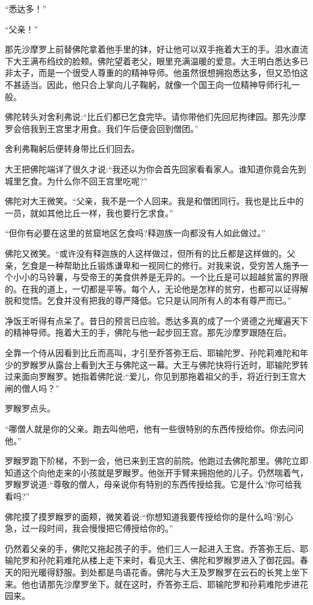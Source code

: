 \documentclass[12pt,twoside,openany]{book}
\begin{document}
“悉达多！”

“父亲！”

那先沙摩罗上前替佛陀拿着他手里的钵，好让他可以双手拖着大王的手。泪水直流下大王满布绉纹的脸颊。佛陀望着老父，眼里充满温暖的爱意。大王明白悉达多已非太子，而是一个很受人尊重的的精神导师。他虽然很想拥抱悉达多，但又恐怕这不甚适当。因此，他只合上掌向儿子鞠躬，就像一个国王向一位精神导师行礼一般。

佛陀转头对舍利弗说:“比丘们都已乞食完毕。请你带他们先回尼拘律园。那先沙摩罗会倍我到王宫里才用食。我们午后便会回到僧团。”

舍利弗鞠躬后便转身带比丘们回去。

大王把佛陀端详了很久才说:“我还以为你会首先回家看看家人。谁知道你竟会先到城里乞食。为什么你不回王宫里吃呢?”

佛陀对大王微笑。“父亲，我不是一个人回来。我是和僧团同行。我也是比丘中的一员，就如其他比丘一样，我也要行乞求食。”

“但你有必要在这里的贫窟地区乞食吗?释迦族一向都没有人如此做过。”

佛陀又微笑。“或许没有释迦族的人这样做过，但所有的比丘都是这样做的。父亲，乞食是一种帮助比丘锻炼谦卑和一视同仁的修行。对我来说，受穷苦人施予一个小小的马铃薯，与受帝王的美食供养是无异的。一个比丘是可以超越贫富的界限的。在我的道上，一切都是平等。每个人，无论他是怎样的贫穷，也都可以证得解脱和觉悟。乞食并没有把我的尊严降低。它只是认同所有人的本有尊严而已。”

净饭王听得有点呆了。昔日的预言已应验。悉达多真的成了一个贤德之光耀遍天下的精神导师。拖着大王的手，佛陀与他一起步回王宫。那先沙摩罗跟随在后。

全靠一个侍从因看到比丘而高叫，才引至乔答弥王后、耶输陀罗、孙陀莉难陀和年少的罗睺罗从露台上看到大王与佛陀这一幕。大王与佛陀快将行近时，耶输陀罗转过来面向罗睺罗。她指着佛陀说:“爱儿，你见到那拖着祖父的手，将近行到王宫大闸的僧人吗？”

罗睺罗点头。

“哪僧人就是你的父亲。跑去叫他吧，他有一些很特别的东西传授给你。你去问问他。”

罗睺罗跑下阶梯，不到一会，他已来到王宫的前院。他跑过去佛陀那里。佛陀立即知道这个向他走来的小孩就是罗睺罗。他张开手臂来拥抱他的儿子。仍然喘着气，罗睺罗说道:“尊敬的僧人，母亲说你有特别的东西传授给我。它是什么?你可给我看吗?”

佛陀摸了摸罗睺罗的面颊，微笑着说:“你想知道我要传授给你的是什么吗?别心急，过一段时间，我会慢慢把它傅授给你的。”

仍然着父亲的手，佛陀又拖起孩子的手。他们三人一起进入王宫。乔答弥王后、耶输陀罗和孙陀莉难陀从楼上走下来时，看见大王、佛陀和罗睺罗进入了御花园。春天的阳光暖得舒服。到处都是鸟语花香。佛陀与大王及罗睺罗在云石的长凳上坐下来。他也请那先沙摩罗坐下。就在这时，乔答弥王后、耶输陀罗和孙莉难陀步进花园来。
\end{document}
